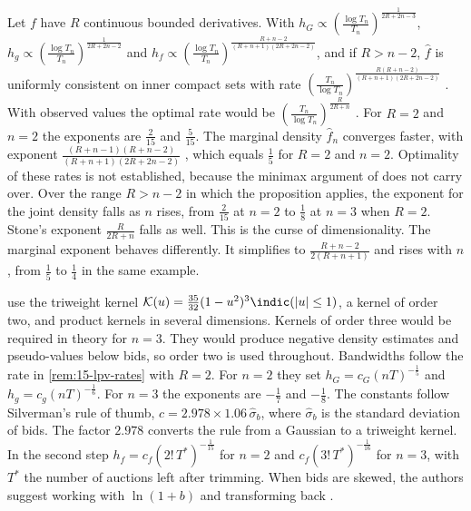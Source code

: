 \begin{remark}[Rates]\label{rem:15-lpv-rates}
Let $f$ have $R$ continuous bounded derivatives. With $h_G\propto(\frac{\log T_n}{T_n})^{\frac{1}{2R+2n-3}}$,
$h_g\propto(\frac{\log T_n}{T_n})^{\frac{1}{2R+2n-2}}$ and
$h_f\propto(\frac{\log T_n}{T_n})^{\frac{R+n-2}{(R+n+1)(2R+2n-2)}}$, and if $R>n-2$, $\hat f$ is uniformly
consistent on inner compact sets with rate $(\frac{T_n}{\log T_n})^{\frac{R(R+n-2)}{(R+n+1)(2R+2n-2)}}$
\citep[Proposition~2]{LiPerrigneVuong2002}. With observed values the optimal rate would be
$(\frac{T_n}{\log T_n})^{\frac{R}{2R+n}}$ \citep{Stone1982}. For $R=2$ and $n=2$ the exponents are
$\frac{2}{15}$ and $\frac{5}{15}$. The marginal density $\hat f_n$ converges faster, with exponent
$\frac{(R+n-1)(R+n-2)}{(R+n+1)(2R+2n-2)}$ \citep[Proposition~3]{LiPerrigneVuong2002}, which equals
$\frac15$ for $R=2$ and $n=2$. Optimality of these rates is not established, because the minimax argument of
\citet{GuerrePerrigneVuong2000} does not carry over. Over the range $R>n-2$ in which the proposition applies, the
exponent for the joint density falls as $n$ rises, from $\frac{2}{15}$ at $n=2$ to $\frac18$ at $n=3$ when $R=2$.
Stone's exponent $\frac{R}{2R+n}$ falls as well. This is the curse of dimensionality. The marginal exponent behaves
differently. It simplifies to $\frac{R+n-2}{2(R+n+1)}$ and rises with $n$, from $\frac15$ to $\frac14$ in the same
example.
\end{remark}

 \citet[pp.~180--181]{LiPerrigneVuong2002} use the triweight kernel
$\mathcal K(u)=\frac{35}{32}(1-u^2)^3\indic(|u|\le1)$, a kernel of order two, and product kernels in several
dimensions. Kernels of order three would be required in theory for $n=3$. They would produce negative
density estimates and pseudo-values below bids, so order two is used throughout. Bandwidths follow the
rate in \cref{rem:15-lpv-rates} with $R=2$. For $n=2$ they set $h_G=c_G(nT)^{-\frac15}$ and
$h_g=c_g(nT)^{-\frac16}$. For $n=3$ the exponents are $-\frac17$ and $-\frac18$. The constants follow
Silverman's rule of thumb, $c=2.978\times1.06\,\hat\sigma_b$, where $\hat\sigma_b$ is the standard
deviation of bids. The factor $2.978$ converts the rule from a Gaussian to a triweight kernel. In the second
step $h_f=c_f(2!\,T^\ast)^{-\frac{1}{15}}$ for $n=2$ and $c_f(3!\,T^\ast)^{-\frac{1}{16}}$ for $n=3$, with
$T^\ast$ the number of auctions left after trimming. When bids are skewed, the authors suggest working with
$\ln(1+b)$ and transforming back \citep[footnote~13]{LiPerrigneVuong2002}.

